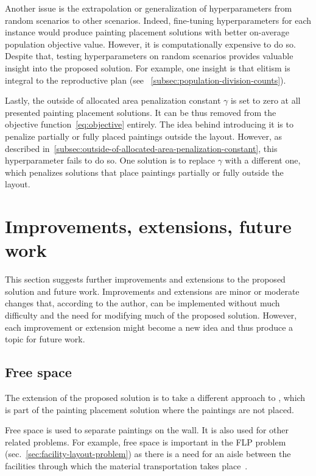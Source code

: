 Another issue is the extrapolation or generalization of hyperparameters from random scenarios to other scenarios.
Indeed, fine-tuning hyperparameters for each instance would produce painting placement solutions with better on-average population objective value.
However, it is computationally expensive to do so.
Despite that, testing hyperparameters on random scenarios provides valuable insight into the proposed solution.
For example, one insight is that elitism is integral to the reproductive plan (see ~\ref{subsec:population-division-counts}).

Lastly, the outside of allocated area penalization constant $\gamma$ is set to zero at all presented painting placement solutions.
It can be thus removed from the objective function~\ref{eq:objective} entirely.
The idea behind introducing it is to penalize partially or fully placed paintings outside the layout.
However, as described in~\ref{subsec:outside-of-allocated-area-penalization-constant}, this hyperparameter fails to do so.
One solution is to replace $\gamma$ with a different one,
which penalizes solutions that place paintings partially or fully outside the layout.


\section{Improvements, extensions, future work}\label{sec:improvements}
This section suggests further improvements and extensions to the proposed solution
and future work.
Improvements and extensions are minor or moderate changes that, according to the author,
can be implemented without much difficulty and the need for modifying
much of the proposed solution.
However, each improvement or extension might become a new idea and thus produce a topic for future work.

\subsection{Free space}\label{subsec:free-space}

The extension of the proposed solution is to take a different approach to
, which is part of the painting placement solution where the paintings are not placed.

Free space is used to separate paintings on the wall.
It is also used for other related problems.
For example, free space is important in the FLP problem (sec.~\ref{sec:facility-layout-problem})
as there is a need for an aisle between the facilities
through which the material transportation takes place~\cite{scholzExtensionsSTaTSPractical2010}.

